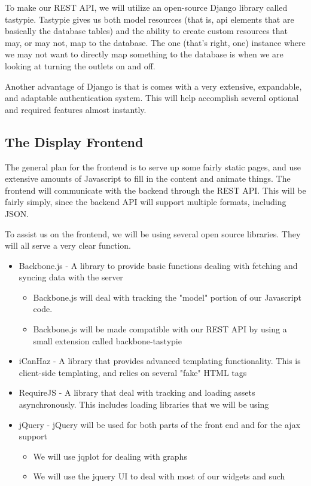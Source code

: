 To make our REST API, we will utilize an open-source Django library called tastypie. Tastypie gives us both model resources (that is, api elements that are basically the database tables) and the ability to create custom resources that may, or may not, map to the database. The one (that's right, one) instance where we may not want to directly map something to the database is when we are looking at turning the outlets on and off.

Another advantage of Django is that is comes with a very extensive, expandable, and adaptable authentication system. This will help accomplish several optional and required features almost instantly. 

\subsection{The Display Frontend}

The general plan for the frontend is to serve up some fairly static pages, and use extensive amounts of Javascript to fill in the content and animate things. The frontend will communicate with the backend through the REST API. This will be fairly simply, since the backend API will support multiple formats, including JSON.

To assist us on the frontend, we will be using several open source libraries. They will all serve a very clear function.

\begin{itemize}
 \item Backbone.js - A library to provide basic functions dealing with fetching and syncing data with the server
 \begin{itemize}
  \item Backbone.js will deal with tracking the "model" portion of our Javascript code.
  \item Backbone.js will be made compatible with our REST API by using a small extension called backbone-tastypie
 \end{itemize}
 \item iCanHaz - A library that provides advanced templating functionality. This is client-side templating, and relies on several "fake" HTML tags
 \item RequireJS - A library that deal with tracking and loading assets asynchronously. This includes loading libraries that we will be using
 \item jQuery - jQuery will be used for both parts of the front end and for the ajax support
 \begin{itemize}
  \item We will use jqplot for dealing with graphs
  \item We will use the jquery UI to deal with most of our widgets and such
 \end{itemize}
\end{itemize}

